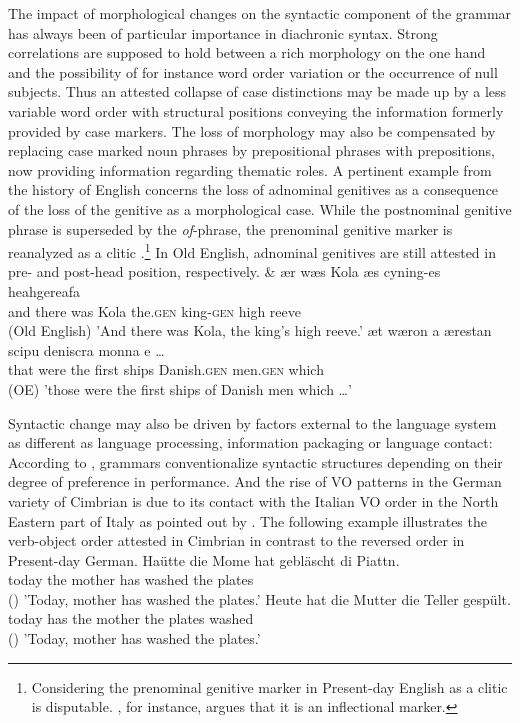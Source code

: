 \documentclass[output=paper
                ,modfonts
                ,nonflat
	        ,collection
	        ,collectionchapter
	        ,collectiontoclongg
 	        ,biblatex
                ,babelshorthands
                ,newtxmath
                ,draftmode
                ,colorlinks, citecolor=brown
]{./langsci/langscibook}
\begin{document}
The impact of morphological changes on the syntactic component of the grammar has always been of particular importance in diachronic syntax. Strong correlations are supposed to hold between a rich morphology on the one hand and the possibility of for instance word order variation or the occurrence of null subjects. Thus an attested collapse of case distinctions may be made up by a less variable word order with structural positions conveying the information formerly provided by case markers. The loss of morphology may also be compensated by replacing case marked noun phrases by prepositional phrases with prepositions, now providing information regarding thematic roles. A pertinent example from the history of English concerns the loss of adnominal genitives as a consequence of the loss of the genitive as a morphological case. While the postnominal genitive phrase is superseded by the \textit{of}-phrase, the prenominal genitive marker is reanalyzed as a clitic \citep{allen2006}.\footnote{Considering the prenominal genitive marker in Present-day English as a clitic is disputable. \cite{zwicky1987}, for instance, argues that it is an inflectional marker.} In Old English, adnominal genitives are still attested in pre- and post-head position, respectively. 
\eal
\ex
\gll \& \th ær wæs Kola \dh æs cyning-es heahgereafa \\ and there was Kola the.\textsc{gen} king-\textsc{gen} {high reeve}  \\ \hfill (Old English)
\glt 'And there was Kola, the king's high reeve.' 
\ex
\gll \th æt wæron \th a ærestan scipu deniscra monna \th e \dots \\ that were the first ships Danish.\textsc{gen} men.\textsc{gen} which \\ \hfill (OE)
\glt 'those were the first ships of Danish men which \dots'
\zl

Syntactic change may also be driven by factors external to the language system as different as language processing, information packaging or language contact: According to \cite{hawkins2004}, grammars conventionalize syntactic structures depending on their degree of preference in performance. And the rise of VO patterns in the German variety of Cimbrian is due to its contact with the Italian VO order in the North Eastern part of Italy as pointed out by \cite{GrPo2005}. The following example illustrates the verb-object order attested in Cimbrian in contrast to the reversed order in Present-day German.
\eal
\ex
\gll Haütte die Mome hat gebläscht di Piattn.  \\ today the mother has washed the plates \\ \hfill ()
\glt 'Today, mother has washed the plates.' 
\ex 
\gll Heute hat die Mutter die Teller gespült.  \\ today has the mother the plates washed \\ \hfill ()
\glt 'Today, mother has washed the plates.' 
\zl
\end{document}
